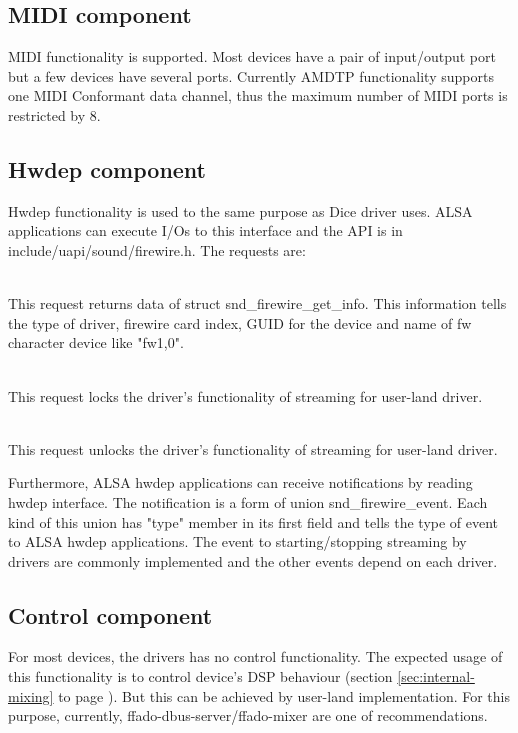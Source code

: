 \documentclass[onecolumn]{article}
\begin{document}
\subsection{MIDI component}

MIDI functionality is supported. Most devices have a pair of input/output port but a few devices have several ports. Currently AMDTP functionality supports one MIDI Conformant data channel, thus the maximum number of MIDI ports is restricted by 8.

\subsection{Hwdep component}
Hwdep functionality is used to the same purpose as Dice driver uses. ALSA applications can execute I/Os to this interface and the API is in include/uapi/sound/firewire.h. The requests are:

\begin{description}
\small
\item [SNDRV\_FIREWIRE\_IOCTL\_GET\_INFO] \mbox{} \\
This request returns data of struct snd\_firewire\_get\_info. This information tells the type of driver, firewire card index, GUID for the device and name of fw character device like "fw1,0".
\item [SNDRV\_FIREWIRE\_IOCTL\_LOCK] \mbox{} \\
This request locks the driver's functionality of streaming for user-land driver.
\item [SNDRV\_FIREWIRE\_IOCTL\_UNLOCK] \mbox{} \\
This request unlocks the driver's functionality of streaming for user-land driver.
\end{description}

Furthermore, ALSA hwdep applications can receive notifications by reading hwdep interface. The notification is a form of union snd\_firewire\_event. Each kind of this union has "type" member in its first field and tells the type of event to ALSA hwdep applications. The event to starting/stopping streaming by drivers are commonly implemented and the other events depend on each driver.

\subsection{Control component}
For most devices, the drivers has no control functionality. The expected usage of this functionality is to control device's DSP behaviour (section \ref{sec:internal-mixing} to page \pageref{sec:internal-mixing}). But this can be achieved by user-land implementation. For this purpose, currently, ffado-dbus-server/ffado-mixer are one of recommendations.
\end{document}
